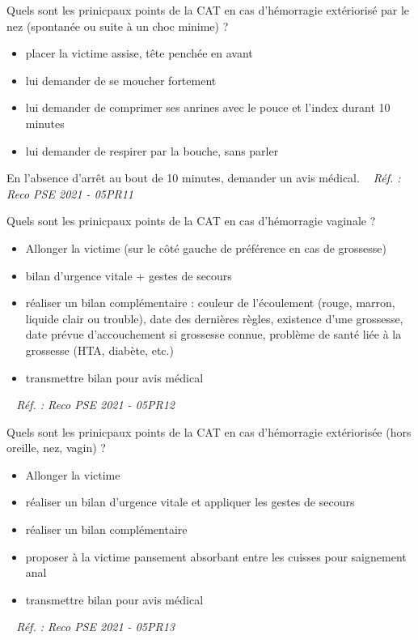\documentclass[grid,avery5371,landscape]{flashcards}
\makeatletter
\newcounter{nocarte}
\newcommand{\categ}[1]{%
  \def\@categ{#1}%
  \setcounter{nocarte}{0}%
}
\newcommand{\source}[1]{%
  \medskip
  \itshape%
   ~ \hfill Réf. : #1}
\makeatother
\begin{document}
\color[HTML]{003273}
\categ{PSE}
\begin{flashcard}[CAT]{
 Quels sont les prinicpaux points de la CAT en cas d'hémorragie extériorisé par le nez (spontanée ou suite à un choc minime) ?   }
  \begin{itemize}
\item placer la victime assise, tête penchée en avant 
\item lui demander de se moucher fortement
\item lui demander de comprimer ses anrines avec le pouce et l'index durant 10 minutes 
\item lui demander de respirer par la bouche, sans parler
\end{itemize}
En l'absence d'arrêt au bout de 10 minutes, demander un avis médical.
  \source{Reco PSE 2021 - 05PR11}
\end{flashcard}


\color[HTML]{003273}
\categ{PSE}
\begin{flashcard}[CAT]{
 Quels sont les prinicpaux points de la CAT en cas d'hémorragie vaginale ?   }
  \begin{itemize}
\item Allonger la victime (sur le côté gauche de préférence en cas de grossesse)
\item bilan d'urgence vitale + gestes de secours 
\item réaliser un bilan complémentaire : couleur de l'écoulement (rouge, marron, liquide clair ou trouble), date des dernières règles, existence d'une grossesse, date prévue d'accouchement si grossesse connue, problème de santé liée à la grossesse (HTA, diabète, etc.)
\item transmettre bilan pour avis médical
\end{itemize}
  \source{Reco PSE 2021 - 05PR12}
\end{flashcard}


\color[HTML]{003273}
\categ{PSE}
\begin{flashcard}[CAT]{
 Quels sont les prinicpaux points de la CAT en cas d'hémorragie extériorisée (hors oreille, nez, vagin) ?   }
  \begin{itemize}
\item Allonger la victime 
\item réaliser un bilan d'urgence vitale et appliquer les gestes de secours 
\item réaliser un bilan complémentaire 
\item proposer à la victime pansement absorbant entre les cuisses pour saignement anal
\item transmettre bilan pour avis médical
\end{itemize}
  \source{Reco PSE 2021 - 05PR13}
\end{flashcard}
\end{document}
